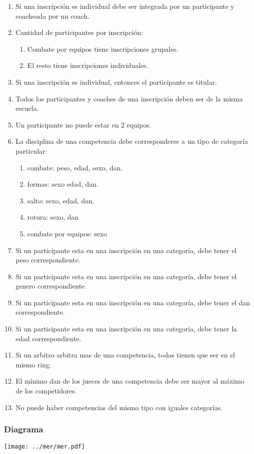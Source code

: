 \begin{enumerate}
  \item Si una inscripción es individual debe ser integrada por un participante y coacheada por un coach.
  \item Cantidad de participantes por inscripción: \begin{enumerate}
    \item Combate por equipos tiene inscripciones grupales.
    \item El resto tiene inscripciones individuales. \end{enumerate}
  \item  Si una inscripción es individual, entonces el participante es titular.
  \item Todos los participantes y coaches de una inscripción deben ser de la misma escuela.
  \item Un participante no puede estar en 2 equipos.
  \item La disciplina de una competencia debe corresponderse a un tipo de categoría particular: \begin{enumerate}
    \item combate: peso, edad, sexo, dan.
    \item formas: sexo edad, dan.
    \item salto: sexo, edad, dan.
    \item rotura: sexo, dan
    \item combate por equipos: sexo \end{enumerate}
  \item Si un participante esta en una inscripción en una categoría, debe tener el peso correspondiente.
  \item Si un participante esta en una inscripción en una categoría, debe tener el genero correspondiente.
  \item Si un participante esta en una inscripción en una categoría, debe tener el dan correspondiente.
  \item Si un participante esta en una inscripción en una categoría, debe tener la edad correspondiente.
  \item Si un arbitro arbitra mas de una competencia, todas tienen que ser en el mismo ring.
  \item El mínimo dan de los jueces de una competencia debe ser mayor al máximo de los competidores.
  \item No puede haber competencias del mismo tipo con iguales categorías.
\end{enumerate}

\subsubsection{Diagrama}

\newpage

\texttt{[image: ../mer/mer.pdf]}

